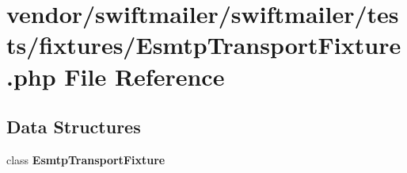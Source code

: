 \section{vendor/swiftmailer/swiftmailer/tests/fixtures/\+Esmtp\+Transport\+Fixture.php File Reference}
\label{_esmtp_transport_fixture_8php}
\subsection*{Data Structures}
\begin{DoxyCompactItemize}
\item 
class {\bf Esmtp\+Transport\+Fixture}
\end{DoxyCompactItemize}

